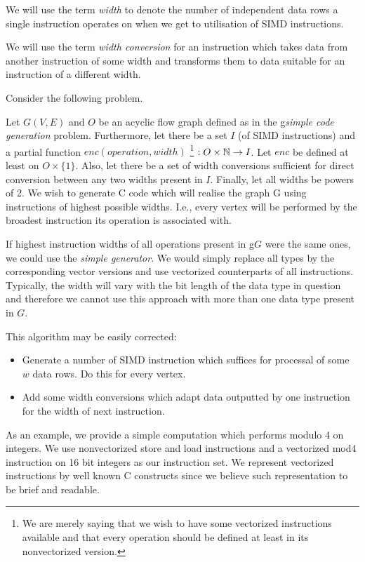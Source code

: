 We will use the term \emph{width} to denote the number of independent data rows a single instruction operates on when we get to utilisation of SIMD instructions.
\myenddef

  We will use the term \emph{width conversion} for an instruction which takes data from another instruction of some width and transforms them to data suitable for an instruction of a different width. 
\myenddef

Consider the following problem.

  Let $G(V,E)$ and $O$ be an acyclic flow graph defined as in the g\emph{simple code generation} problem. Furthermore, let there be a set $I$ (of SIMD instructions) and a partial function $enc (operation, width)$ \footnote{We are merely saying that we wish to have some vectorized instructions available and that every operation should be defined at least in its nonvectorized version.} $: O \times \mathbb{N} \rightarrow I$. Let $enc$ be defined at least on $O \times \{1\}$. Also, let there be a set of width conversions sufficient for direct conversion between any two widths present in $I$. Finally, let all widths be powers of 2. We wish to generate C code which will realise the graph G using instructions of highest possible widths. I.e., every vertex will be performed by the broadest instruction its operation is associated with. 
\myendprob

If highest instruction widths of all operations present in g$G$ were the same ones, we could use the \emph{simple generator}. We would simply replace all types by the corresponding vector versions and use vectorized counterparts of all instructions. Typically, the width will vary with the bit length of the data type in question and therefore we cannot use this approach with more than one data type present in $G$.


This algorithm may be easily corrected:
\begin{itemize}
  \item Generate a number of SIMD instruction which suffices for processal of some $w$ data rows. Do this for every vertex.
  \item Add some width conversions which adapt data outputted by one instruction for the width of next instruction.
\end{itemize}

As an example, we provide a simple computation which performs modulo 4 on integers. We use nonvectorized store and load instructions and a vectorized mod4 instruction on 16 bit integers as our instruction set. We represent vectorized instructions by well known C constructs since we believe such representation to be brief and readable.

